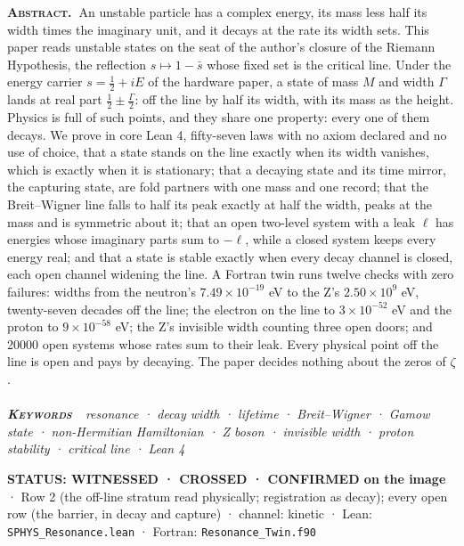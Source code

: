 \documentclass[10pt]{article}
\renewenvironment{quote}{\par\smallskip\noindent\small\color{deep}}{\par\smallskip}
\begin{document}
{\small\noindent\textbf{\scshape\color{deep}Abstract.\ }An unstable
particle has a complex energy, its mass less half its width times the
imaginary unit, and it decays at the rate its width sets. This paper
reads unstable states on the seat of the author's closure of the Riemann
Hypothesis, the reflection \(s\mapsto1-\bar s\) whose fixed set is the
critical line. Under the energy carrier \(s=\tfrac12+iE\) of the
hardware paper, a state of mass \(M\) and width \(\Gamma\) lands at real
part \(\tfrac12\pm\tfrac\Gamma2\): off the line by half its width, with
its mass as the height. Physics is full of such points, and they share
one property: every one of them decays. We prove in core Lean 4,
fifty-seven laws with no axiom declared and no use of choice, that a
state stands on the line exactly when its width vanishes, which is
exactly when it is stationary; that a decaying state and its time
mirror, the capturing state, are fold partners with one mass and one
record; that the Breit--Wigner line falls to half its peak exactly at
half the width, peaks at the mass and is symmetric about it; that an
open two-level system with a leak \(\ell\) has energies whose imaginary
parts sum to \(-\ell\), while a closed system keeps every energy real;
and that a state is stable exactly when every decay channel is closed,
each open channel widening the line. A Fortran twin runs twelve checks
with zero failures: widths from the neutron's \(7.49\times10^{-19}\) eV
to the Z's \(2.50\times10^{9}\) eV, twenty-seven decades off the line;
the electron on the line to \(3\times10^{-52}\) eV and the proton to
\(9\times10^{-58}\) eV; the Z's invisible width counting three open
doors; and 20000 open systems whose rates sum to their leak. Every
physical point off the line is open and pays by decaying. The paper
decides nothing about the zeros of \(\zeta\).}\\[-2pt]
\noindent{\color{accent}\rule{\textwidth}{0.6pt}}\\[1pt]
{\itshape\footnotesize\color{faint}\noindent\textbf{\upshape\scshape\color{deep}Keywords\ }\ resonance
· decay width · lifetime · Breit--Wigner · Gamow state · non-Hermitian
Hamiltonian · Z boson · invisible width · proton stability · critical
line · Lean 4}\par\vspace{8pt}
\thispagestyle{fancy}
\begin{quote}
\textbf{STATUS: WITNESSED · CROSSED · CONFIRMED on the image} · Row 2
(the off-line stratum read physically; registration as decay); every
open row (the barrier, in decay and capture) · channel: kinetic · Lean:
\texttt{SPHYS\_Resonance.lean} · Fortran: \texttt{Resonance\_Twin.f90}
\end{quote}
\end{document}
